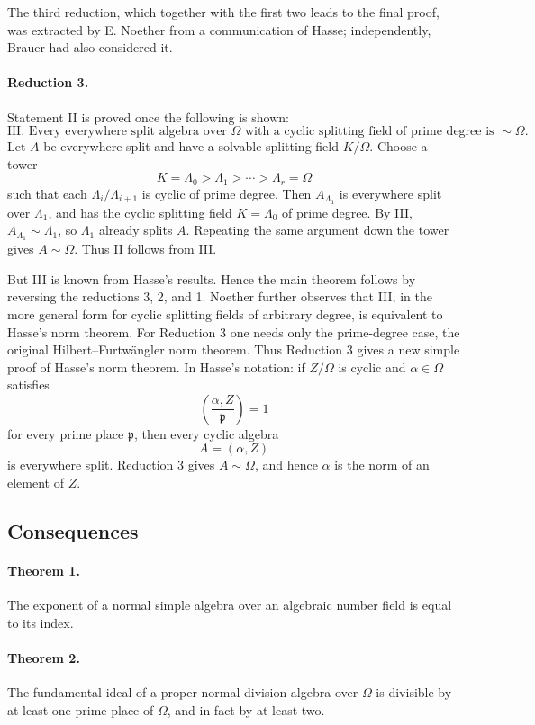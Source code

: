 \documentclass[11pt]{article}
\providecommand{\Om}{\Omega}
\begin{document}
The third reduction, which together with the first two leads to the final proof, was extracted by E. Noether from a communication of Hasse; independently, Brauer had also considered it.

\paragraph{Reduction 3.}
Statement II is proved once the following is shown:
\[
\text{III. Every everywhere split algebra over }\Om\text{ with a cyclic splitting field of prime degree is } \sim\Om .
\]
Let \(A\) be everywhere split and have a solvable splitting field \(K/\Om\). Choose a tower
\[
        K=\Lambda_0>\Lambda_1>\cdots>\Lambda_r=\Om
\]
such that each \(\Lambda_i/\Lambda_{i+1}\) is cyclic of prime degree. Then \(A_{\Lambda_1}\) is everywhere split over \(\Lambda_1\), and has the cyclic splitting field \(K=\Lambda_0\) of prime degree. By III, \(A_{\Lambda_1}\sim\Lambda_1\), so \(\Lambda_1\) already splits \(A\). Repeating the same argument down the tower gives \(A\sim\Om\). Thus II follows from III.

But III is known from Hasse's results. Hence the main theorem follows by reversing the reductions 3, 2, and 1. Noether further observes that III, in the more general form for cyclic splitting fields of arbitrary degree, is equivalent to Hasse's norm theorem. For Reduction 3 one needs only the prime-degree case, the original Hilbert--Furtwängler norm theorem. Thus Reduction 3 gives a new simple proof of Hasse's norm theorem. In Hasse's notation: if \(Z/\Om\) is cyclic and \(\alpha\in\Om\) satisfies
\[
        \left(\frac{\alpha,Z}{\mathfrak p}\right)=1
\]
for every prime place \(\mathfrak p\), then every cyclic algebra
\[
        A=(\alpha,Z)
\]
is everywhere split. Reduction 3 gives \(A\sim\Om\), and hence \(\alpha\) is the norm of an element of \(Z\).

\subsection*{Consequences}

\paragraph{Theorem 1.}
The exponent of a normal simple algebra over an algebraic number field is equal to its index.

\paragraph{Theorem 2.}
The fundamental ideal of a proper normal division algebra over \(\Om\) is divisible by at least one prime place of \(\Om\), and in fact by at least two.
\end{document}
